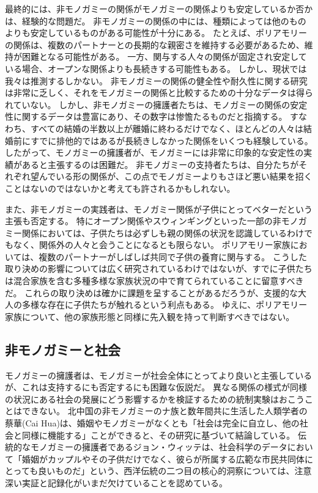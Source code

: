 \documentclass[paper=a4,book,openany]{jlreq}
\begin{document}
最終的には、非モノガミーの関係がモノガミーの関係よりも安定しているか否かは、経験的な問題だ。
非モノガミーの関係の中には、種類によっては他のものよりも安定しているものがある可能性が十分にある。
たとえば、ポリアモリーの関係は、複数のパートナーとの長期的な親密さを維持する必要があるため、維持が困難となる可能性がある。
一方、関与する人々の関係が固定され安定している場合、オープンな関係よりも長続きする可能性もある。
しかし、現状では我々は推測するしかない。
非モノガミーの関係の健全性や耐久性に関する研究は非常に乏しく、それをモノガミーの関係と比較するための十分なデータは得られていない。
しかし、非モノガミーの擁護者たちは、モノガミーの関係の安定性に関するデータは豊富にあり、その数字は惨憺たるものだと指摘する。
すなわち、すべての結婚の半数以上が離婚に終わるだけでなく、ほとんどの人々は結婚前にすでに排他的ではあるが長続きしなかった関係をいくつも経験している。
したがって、モノガミーの擁護者が、モノガミーには非常に印象的な安定性の実績があると主張するのは困難だ。
非モノガミーの支持者たちは、自分たちがそれぞれ望んでいる形の関係が、この点でモノガミーよりもさほど悪い結果を招くことはないのではないかと考えても許されるかもしれない。

また、非モノガミーの実践者は、モノガミー関係が子供にとってベターだという主張も否定する。
特にオープン関係やスウィンギングといった一部の非モノガミー関係においては、子供たちは必ずしも親の関係の状況を認識しているわけでもなく、関係外の人々と会うことになるとも限らない。
ポリアモリー家族においては、複数のパートナーがしばしば共同で子供の養育に関与する。
こうした取り決めの影響については広く研究されているわけではないが、すでに子供たちは混合家族を含む多種多様な家族状況の中で育てられていることに留意すべきだ。
これらの取り決めは確かに課題を呈することがあるだろうが、支援的な大人の多様な存在に子供たちが触れるという利点もある。
ゆえに、ポリアモリー家族について、他の家族形態と同様に先入観を持って判断すべきではない\citep[p.191]{sheff15:_polyam_next_door}。

\subsection{非モノガミーと社会}

モノガミーの擁護者は、モノガミーが社会全体にとってより良いと主張しているが、これは支持するにも否定するにも困難な仮説だ。
異なる関係の様式が同様の状況にある社会の発展にどう影響するかを検証するための統制実験はおこうことはできない。
北中国の非モノガミーのナ族と数年間共に生活した人類学者の蔡華(Cai Hua)は、婚姻やモノガミーがなくとも「社会は完全に自立し、他の社会と同様に機能する」ことができると、その研究に基づいて結論している\citep{hua03:_societ_without_father_husban}。
伝統的なモノガミーの擁護者であるジョン・ウィッテは、社会科学のデータにおいて「婚姻がカップルやその子供だけでなく、彼らが所属する広範な市民共同体にとっても良いものだ」という、西洋伝統の二つ目の核心的洞察については、注意深い実証と記録化がいまだ欠けていることを認めている\citep[p.1070]{witte01:_goods_goals_marriag}。
\end{document}
